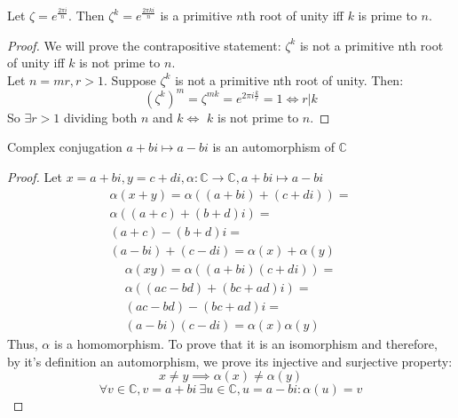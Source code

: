 \begin{proposition}
    Let $\zeta = e^{\frac{2\pi i}{n}}$. Then $\zeta^k = e^{\frac{2\pi ki}{n}}$ is a primitive $n$th root of unity
    iff $k$ is prime to $n$.
\end{proposition}
\begin{proof}
    We will prove the contrapositive statement: $\zeta^k$ is not a primitive nth root of unity iff $k$ is not prime to $n$.\\
    Let $n = mr, r > 1$. Suppose $\zeta^k$ is not a primitive nth root of unity. Then:
    \[(\zeta^k)^m = \zeta^{mk} = e^{2\pi i\frac{k}{r}} = 1 \iff r|k\]
    So $\exists r > 1$ dividing both $n$ and $k \iff$ $k$ is not prime to $n$.
\end{proof}

\begin{examples}
\begin{example} \label{example: complex conjugate}
    Complex conjugation $a + bi \mapsto a - bi$ is an automorphism of $\mathbb{C}$
\end{example}
\begin{proof}
    Let $x = a + bi,y = c + di,\alpha : \mathbb{C} \to \mathbb{C},a + bi \mapsto a - bi$
    \begin{equation*}
    \begin{split}
        \alpha(x + y) = \alpha((a + bi) + (c + di)) =\\
        \alpha((a + c) + (b + d)i) =\\
        (a + c) - (b + d)i =\\
        (a - bi) + (c - di) = \alpha(x) + \alpha(y)    
    \end{split}
    \end{equation*}
    \begin{equation*}
    \begin{split}
        \alpha(xy) = \alpha((a + bi)(c + di)) =\\
        \alpha((ac - bd) + (bc + ad)i) =\\
        (ac - bd) - (bc + ad)i =\\
        (a - bi)(c - di) = \alpha(x)\alpha(y)
    \end{split}
    \end{equation*}
    Thus, $\alpha$ is a homomorphism. To prove that it is an isomorphism and therefore, by it's definition an automorphism, we
    prove its injective and surjective property:
    \[x \neq y \implies \alpha(x) \neq \alpha(y)\]
    \[\forall v \in \mathbb{C},v = a + bi \ \exists u \in \mathbb{C},u = a - bi : \alpha(u) = v\]
\end{proof}


\end{examples}
